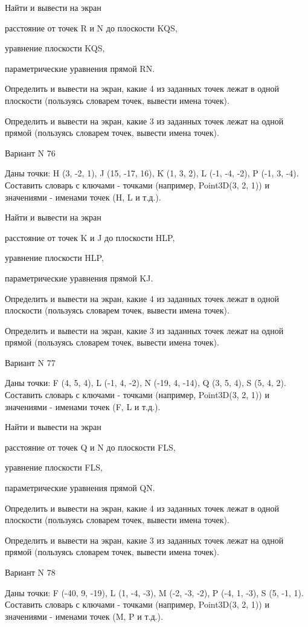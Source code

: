 \documentclass[11pt]{report}
\begin{document}
 
Найти и вывести на экран


расстояние от точек R и N до плоскости KQS,

 
уравнение плоскости KQS,

 
параметрические уравнения прямой RN.


Определить и вывести на экран, какие 4 из заданных точек лежат в одной плоскости (пользуясь словарем точек, вывести имена точек).


Определить и вывести на экран, какие 3 из заданных точек лежат на одной прямой (пользуясь словарем точек, вывести имена точек).

Вариант N 76

Даны точки: H (3, -2, 1), J (15, -17, 16), K (1, 3, 2), L (-1, -4, -2), P (-1, 3, -4).
Составить словарь с ключами - точками (например, Point3D(3, 2, 1)) и значениями - именами точек (H, L и т.д.).

 
Найти и вывести на экран


расстояние от точек K и J до плоскости HLP,

 
уравнение плоскости HLP,

 
параметрические уравнения прямой KJ.


Определить и вывести на экран, какие 4 из заданных точек лежат в одной плоскости (пользуясь словарем точек, вывести имена точек).


Определить и вывести на экран, какие 3 из заданных точек лежат на одной прямой (пользуясь словарем точек, вывести имена точек).

Вариант N 77

Даны точки: F (4, 5, 4), L (-1, 4, -2), N (-19, 4, -14), Q (3, 5, 4), S (5, 4, 2).
Составить словарь с ключами - точками (например, Point3D(3, 2, 1)) и значениями - именами точек (F, L и т.д.).

 
Найти и вывести на экран


расстояние от точек Q и N до плоскости FLS,

 
уравнение плоскости FLS,

 
параметрические уравнения прямой QN.


Определить и вывести на экран, какие 4 из заданных точек лежат в одной плоскости (пользуясь словарем точек, вывести имена точек).


Определить и вывести на экран, какие 3 из заданных точек лежат на одной прямой (пользуясь словарем точек, вывести имена точек).

Вариант N 78

Даны точки: F (-40, 9, -19), L (1, -4, -3), M (-2, -3, -2), P (-4, 1, -3), S (5, -1, 1).
Составить словарь с ключами - точками (например, Point3D(3, 2, 1)) и значениями - именами точек (M, P и т.д.).
\end{document}

